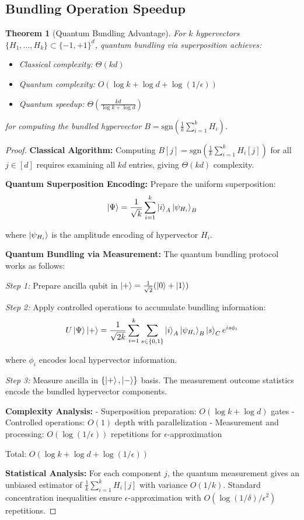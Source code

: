 \documentclass[11pt]{article}
\newtheorem{theorem}{Theorem}[section]
\begin{document}
\subsection{Bundling Operation Speedup}

\begin{theorem}[Quantum Bundling Advantage]
\label{thm:bundling_detailed}
For $k$ hypervectors $\{H_1, \ldots, H_k\} \subset \{-1, +1\}^d$, quantum bundling via superposition achieves:
\begin{itemize}
\item Classical complexity: $\Theta(kd)$
\item Quantum complexity: $O(\log k + \log d + \log(1/\epsilon))$
\item Quantum speedup: $\Theta\left(\frac{kd}{\log k + \log d}\right)$
\end{itemize}
for computing the bundled hypervector $B = \text{sgn}\left(\frac{1}{k}\sum_{i=1}^k H_i\right)$.
\end{theorem}

\begin{proof}
\textbf{Classical Algorithm:} Computing $B[j] = \text{sgn}\left(\frac{1}{k}\sum_{i=1}^k H_i[j]\right)$ for all $j \in [d]$ requires examining all $kd$ entries, giving $\Theta(kd)$ complexity.

\textbf{Quantum Superposition Encoding:} Prepare the uniform superposition:
$$\ket{\Psi} = \frac{1}{\sqrt{k}} \sum_{i=1}^k \ket{i}_A \ket{\psi_{H_i}}_B$$

where $\ket{\psi_{H_i}}$ is the amplitude encoding of hypervector $H_i$.

\textbf{Quantum Bundling via Measurement:} 
The quantum bundling protocol works as follows:

\textit{Step 1:} Prepare ancilla qubit in $\ket{+} = \frac{1}{\sqrt{2}}(\ket{0} + \ket{1})$

\textit{Step 2:} Apply controlled operations to accumulate bundling information:
$$U\ket{\Psi}\ket{+} = \frac{1}{\sqrt{2k}} \sum_{i=1}^k \sum_{s \in \{0,1\}} \ket{i}_A \ket{\psi_{H_i}}_B \ket{s}_C e^{is\phi_i}$$

where $\phi_i$ encodes local hypervector information.

\textit{Step 3:} Measure ancilla in $\{\ket{+}, \ket{-}\}$ basis. The measurement outcome statistics encode the bundled hypervector components.

\textbf{Complexity Analysis:}
- Superposition preparation: $O(\log k + \log d)$ gates
- Controlled operations: $O(1)$ depth with parallelization  
- Measurement and processing: $O(\log(1/\epsilon))$ repetitions for $\epsilon$-approximation

Total: $O(\log k + \log d + \log(1/\epsilon))$

\textbf{Statistical Analysis:} 
For each component $j$, the quantum measurement gives an unbiased estimator of $\frac{1}{k}\sum_{i=1}^k H_i[j]$ with variance $O(1/k)$. Standard concentration inequalities ensure $\epsilon$-approximation with $O(\log(1/\delta)/\epsilon^2)$ repetitions.
\end{proof}
\end{document}
